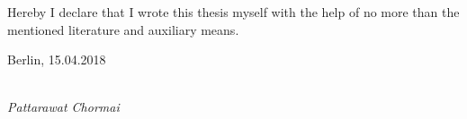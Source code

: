 \newpage

\thispagestyle{empty}

\begin{large}

\vspace*{6cm}

\noindent
Hereby I declare that I wrote this thesis myself with the help of no more than the mentioned literature and auxiliary means.
\vspace{2cm}

\noindent
Berlin, 15.04.2018

\vspace{3cm}

\hspace*{7cm}%
\dotfill\\
\hspace*{8.5cm}%
\textit{Pattarawat Chormai}

\end{large}
